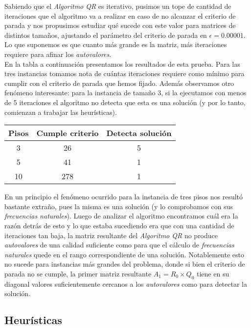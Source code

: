 \documentclass[a4paper]{article}
\begin{document}
Sabiendo que el \textit{Algoritmo QR} es iterativo, pusimos un tope de cantidad de iteraciones que el algoritmo va a realizar en caso de no alcanzar el criterio de parada y nos propusimos estudiar qué sucede con este valor para matrices de distintos tamaños, ajustando el parámetro del criterio de parada en $\epsilon = 0.00001$. Lo que suponemos es que cuanto más grande es la matriz, más iteraciones requiere para afinar los \textit{autovalores}.\\

En la tabla a continuación presentamos los resultados de esta prueba. Para las tres instancias tomamos nota de cuántas iteraciones requiere como mínimo para cumplir con el criterio de parada que hemos fijado. Además observamos otro fenómeno interesante: para la instancia de tamaño 3, si la ejecutamos con menos de 5 iteraciones el algoritmo no detecta que esta es una solución (y por lo tanto, comienzan a trabajar las heurísticas). 

\vspace{2em}
\begin{center}
\begin{tabular}{|c|c|c|}
  \hline
  Pisos & Cumple criterio & Detecta solución \\
  \hline
3   & 26 & 5  \\
5   & 41 & 1  \\
10 & 278 & 1 \\
\hline
\end{tabular}
\end{center}

En un principio el fenómeno ocurrido para la instancia de tres pisos nos resultó bastante extraño, pues la misma es una solución (y lo comprobamos con sus \textit{frecuencias naturales}). Luego de analizar el algoritmo encontramos cuál era la razón detrás de esto y lo que estaba sucediendo era que con una cantidad de iteraciones tan baja, la matriz resultante del \textit{Algoritmo QR} no produce \textit{autovalores} de una calidad suficiente como para que el cálculo de \textit{frecuencias naturales} quede en el rango correspondiente de una solución. Notablemente esto no sucede para instancias más grandes del problema, donde si bien el criterio de parada no se cumple, la primer matriz resultante $A_1 = R_0 \times Q_0$ tiene en su diagonal valores suficientemente cercanos a los \textit{autovalores} como para detectar la solución.

\subsection{Heurísticas}
\end{document}
